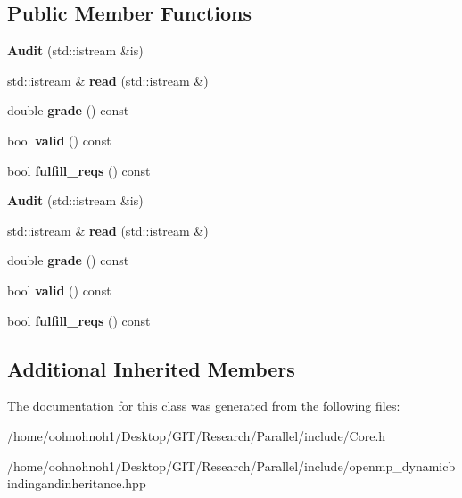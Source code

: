 \subsection*{Public Member Functions}
\begin{DoxyCompactItemize}
\item 
\mbox{\label{classAudit_ade00f5809cf66ccdbcc9067e5b8a1fed}} 
{\bfseries Audit} (std\+::istream \&is)
\item 
\mbox{\label{classAudit_a6919fff1539b7adbaf1f80162b873bd9}} 
std\+::istream \& {\bfseries read} (std\+::istream \&)
\item 
\mbox{\label{classAudit_a9e0ac89e1a2f1a36b3d37788ebec88f7}} 
double {\bfseries grade} () const
\item 
\mbox{\label{classAudit_a88378e2e72af376f5ff11ae5f41dfdfe}} 
bool {\bfseries valid} () const
\item 
\mbox{\label{classAudit_a3c9e02a58c0204f281c574fcd53cab55}} 
bool {\bfseries fulfill\+\_\+reqs} () const
\item 
\mbox{\label{classAudit_ade00f5809cf66ccdbcc9067e5b8a1fed}} 
{\bfseries Audit} (std\+::istream \&is)
\item 
\mbox{\label{classAudit_a6919fff1539b7adbaf1f80162b873bd9}} 
std\+::istream \& {\bfseries read} (std\+::istream \&)
\item 
\mbox{\label{classAudit_a9e0ac89e1a2f1a36b3d37788ebec88f7}} 
double {\bfseries grade} () const
\item 
\mbox{\label{classAudit_a88378e2e72af376f5ff11ae5f41dfdfe}} 
bool {\bfseries valid} () const
\item 
\mbox{\label{classAudit_a3c9e02a58c0204f281c574fcd53cab55}} 
bool {\bfseries fulfill\+\_\+reqs} () const
\end{DoxyCompactItemize}
\subsection*{Additional Inherited Members}


The documentation for this class was generated from the following files\+:\begin{DoxyCompactItemize}
\item 
/home/oohnohnoh1/\+Desktop/\+G\+I\+T/\+Research/\+Parallel/include/Core.\+h\item 
/home/oohnohnoh1/\+Desktop/\+G\+I\+T/\+Research/\+Parallel/include/openmp\+\_\+dynamicbindingandinheritance.\+hpp\end{DoxyCompactItemize}
